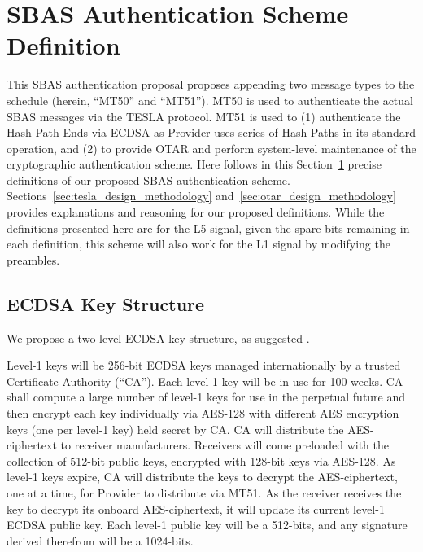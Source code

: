 \documentclass[letterpaper,times]{IONconf/IONconf}
\begin{document}
\section{SBAS Authentication Scheme Definition} \label{sec:sbas_authentication_scheme_definition}

	This SBAS authentication proposal proposes appending two message types to the schedule (herein, ``MT50'' and ``MT51'').
	MT50 is used to authenticate the actual SBAS messages via the TESLA protocol.
	MT51 is used to (1) authenticate the Hash Path Ends via ECDSA as Provider uses series of Hash Paths in its standard operation, and (2) to provide OTAR and perform system-level maintenance of the cryptographic authentication scheme.
	Here follows in this Section~\ref{sec:sbas_authentication_scheme_definition} precise definitions of our proposed SBAS authentication scheme.
	Sections~\ref{sec:tesla_design_methodology} and~\ref{sec:otar_design_methodology} provides explanations and reasoning for our proposed definitions.
	While the definitions presented here are for the L5 signal, given the spare bits remaining in each definition, this scheme will also work for the L1 signal by modifying the preambles.

	\subsection{ECDSA Key Structure} \label{sub:ecdsa_key_structure}

		We propose a two-level ECDSA key structure, as suggested \cite{Neish_Dissertation}.

		Level-1 keys will be 256-bit ECDSA keys managed internationally by a trusted Certificate Authority (``CA'').
		Each level-1 key will be in use for 100 weeks.
		CA shall compute a large number of level-1 keys for use in the perpetual future and then encrypt each key individually via AES-128 with different AES encryption keys (one per level-1 key) held secret by CA.
		CA will distribute the AES-ciphertext to receiver manufacturers.
		Receivers will come preloaded with the collection of 512-bit public keys, encrypted with 128-bit keys via AES-128.
		As level-1 keys expire, CA will distribute the keys to decrypt the AES-ciphertext, one at a time, for Provider to distribute via MT51.
		As the receiver receives the key to decrypt its onboard AES-ciphertext, it will update its current level-1 ECDSA public key.
		Each level-1 public key will be a 512-bits, and any signature derived therefrom will be a 1024-bits.
\end{document}
